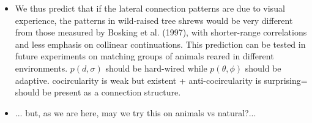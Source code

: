 \documentclass[10pt,handout,ignorenonframetext]{beamer}%
\begin{document}
{{\begin{itemize}
		\item \odot We thus predict that if the lateral connection patterns are due to visual experience, the patterns in wild-raised tree shrews would be very different from those measured by Bosking et al. (1997), with shorter-range correlations and less emphasis on collinear continuations. This prediction can be tested in future experiments on matching groups of animals reared in different environments. $p(d,\sigma)$ should be hard-wired while $p(\theta, \phi)$ should be adaptive. cocircularity is weak but existent + anti-cocircularity is surprising= should be present as a connection structure. %
		\item ... but, as we are here, may we try this on animals vs natural?...
	\end{itemize}
	} %
}
\end{document}
